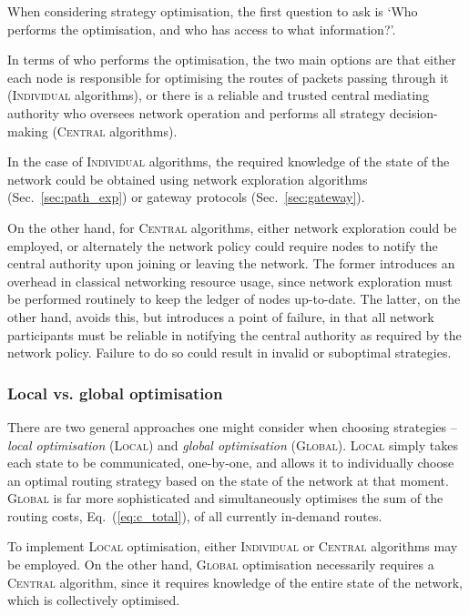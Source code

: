 When considering strategy optimisation, the first question to ask is `Who performs the optimisation, and who has access to what information?'.

In terms of who performs the optimisation, the two main options are that either each node is responsible for optimising the routes of packets passing through it (\textsc{Individual} algorithms), or there is a reliable and trusted central mediating authority who oversees network operation and performs all strategy decision-making (\textsc{Central} algorithms).

In the case of \textsc{Individual} algorithms, the required knowledge of the state of the network could be obtained using network exploration algorithms (Sec.~\ref{sec:path_exp}) or gateway protocols (Sec.~\ref{sec:gateway}). 

On the other hand, for \textsc{Central} algorithms, either network exploration could be employed, or alternately the network policy could require nodes to notify the central authority upon joining or leaving the network. The former introduces an overhead in classical networking resource usage, since network exploration must be performed routinely to keep the ledger of nodes up-to-date. The latter, on the other hand, avoids this, but introduces a point of failure, in that all network participants must be reliable in notifying the central authority as required by the network policy. Failure to do so could result in invalid or suboptimal strategies.

%
%

\subsubsection{Local vs. global optimisation} 

There are two general approaches one might consider when choosing strategies -- \textit{local optimisation} (\textsc{Local}) and \textit{global optimisation} (\textsc{Global}). \textsc{Local} simply takes each state to be communicated, one-by-one, and allows it to individually choose an optimal routing strategy based on the state of the network at that moment. \textsc{Global} is far more sophisticated and simultaneously optimises the sum of the routing costs, Eq.~(\ref{eq:c_total}), of all currently in-demand routes.

To implement \textsc{Local} optimisation, either \textsc{Individual} or \textsc{Central} algorithms may be employed. On the other hand, \textsc{Global} optimisation necessarily requires a \textsc{Central} algorithm, since it requires knowledge of the entire state of the network, which is collectively optimised.

